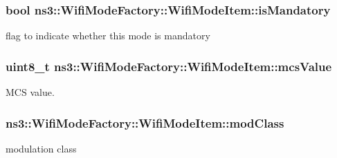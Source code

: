 \subsubsection[{\texorpdfstring{is\+Mandatory}{isMandatory}}]{\setlength{\rightskip}{0pt plus 5cm}bool ns3\+::\+Wifi\+Mode\+Factory\+::\+Wifi\+Mode\+Item\+::is\+Mandatory}\hypertarget{structns3_1_1WifiModeFactory_1_1WifiModeItem_a68457ddea74452573f50e568dfe2eb07}{}\label{structns3_1_1WifiModeFactory_1_1WifiModeItem_a68457ddea74452573f50e568dfe2eb07}


flag to indicate whether this mode is mandatory 

\subsubsection[{\texorpdfstring{mcs\+Value}{mcsValue}}]{\setlength{\rightskip}{0pt plus 5cm}uint8\+\_\+t ns3\+::\+Wifi\+Mode\+Factory\+::\+Wifi\+Mode\+Item\+::mcs\+Value}\hypertarget{structns3_1_1WifiModeFactory_1_1WifiModeItem_a32576c10e5f08dade306d5701a0788db}{}\label{structns3_1_1WifiModeFactory_1_1WifiModeItem_a32576c10e5f08dade306d5701a0788db}


M\+CS value. 

\subsubsection[{\texorpdfstring{mod\+Class}{modClass}}]{ ns3\+::\+Wifi\+Mode\+Factory\+::\+Wifi\+Mode\+Item\+::mod\+Class}\hypertarget{structns3_1_1WifiModeFactory_1_1WifiModeItem_a0fce98678066197ced8149610525c018}{}\label{structns3_1_1WifiModeFactory_1_1WifiModeItem_a0fce98678066197ced8149610525c018}


modulation class 


